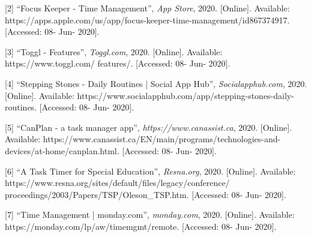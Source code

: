 \documentclass{sigchi}
\begin{document}
[2] ``Focus Keeper - Time Management'', \textit{App Store}, 2020. [Online]. Available: https://apps.apple.com/us/app/focus-keeper-time-management/id867374917. [Accessed: 08- Jun- 2020].

[3] ``Toggl - Features'', \textit{Toggl.com}, 2020. [Online]. Available: https://www.toggl.com/
features/. [Accessed: 08- Jun- 2020].

[4] ``Stepping Stones - Daily Routines | Social App Hub'', \textit{Socialapphub.com}, 2020. [Online]. Available: https://www.socialapphub.com/app/stepping-stones-daily-routines. [Accessed: 08- Jun- 2020].

[5] ``CanPlan - a task manager app'', \textit{https://www.canassist.ca}, 2020. [Online]. Available: https://www.canassist.ca/EN/main/programs/technologies-and-devices/at-home/canplan.html. [Accessed: 08- Jun- 2020].

[6] ``A Task Timer for Special Education'', \textit{Resna.org}, 2020. [Online]. Available: https://www.resna.org/sites/default/files/legacy/conference/
proceedings/2003/Papers/TSP/Oleson\_TSP.htm. [Accessed: 08- Jun- 2020].

[7] ``Time Management | monday.com'', \textit{monday.com}, 2020. [Online]. Available: https://monday.com/lp/aw/timemgmt/remote. [Accessed: 08- Jun- 2020].
\end{document}
